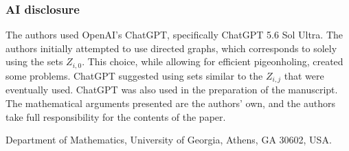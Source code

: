 \documentclass[11pt]{article}
\theoremstyle{plain}
\theoremstyle{definition}
\theoremstyle{definition}
\theoremstyle{remark}
\begin{document}
\subsubsection*{AI disclosure}
The authors used OpenAI's ChatGPT, specifically ChatGPT 5.6 Sol Ultra. The authors initially attempted to use directed graphs, which corresponds to solely using the sets $Z_{i,0}$. This choice, while allowing for efficient pigeonholing, created some problems. ChatGPT suggested using sets similar to the $Z_{i,j}$ that were eventually used. ChatGPT was also used in the preparation of the manuscript. The mathematical arguments presented are the authors' own, and the authors take full responsibility for the contents of the paper.











\hspace{20pt} Department of Mathematics, University of Georgia, Athens, GA 30602, USA.
\end{document}
